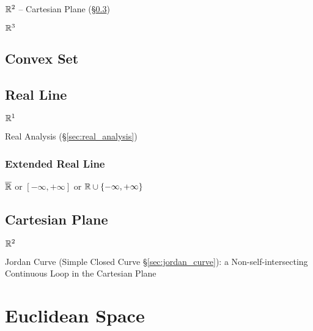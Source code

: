 $\mathbb{R}^2$ -- Cartesian Plane (\S\ref{sec:cartesian_plane})

$\mathbb{R}^3$



\subsection{Convex Set}\label{sec:convex_set}


\subsection{Real Line}\label{sec:real_line}

$\mathbb{R}^1$

\fist Real Analysis (\S\ref{sec:real_analysis})



\subsubsection{Extended Real Line}\label{sec:extended_real_line}

$\overline{\mathbb{R}}$ or $[-\infty, +\infty]$ or $\mathbb{R} \cup \{
-\infty, +\infty\}$




\subsection{Cartesian Plane}\label{sec:cartesian_plane}

$\mathbb{R}^2$

Jordan Curve (Simple Closed Curve \S\ref{sec:jordan_curve}): a
Non-self-intersecting Continuous Loop in the Cartesian Plane



\section{Euclidean Space}\label{sec:euclidean_space}

